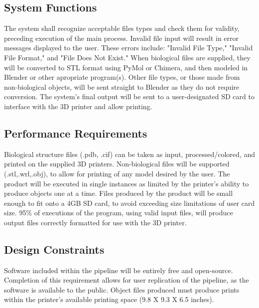 \documentclass[letterpaper, onecolumn, draftclsnofoot, 10pt, compsoc]{IEEEtran}
\begin{document}
    \subsection{System Functions}
    The system shall recognize acceptable files types and check them for validity, preceding execution of the main process.
    Invalid file input will result in error messages displayed to the user.
    These errors include: "Invalid File Type," "Invalid File Format," and "File Does Not Exist."
    When biological files are supplied, they will be converted to STL format using PyMol or Chimera, and then modeled in Blender or other apropriate program(s). 
    Other file types, or those made from non-biological objects, will be sent straight to Blender as they do not require conversion.
    The system's final output will be sent to a user-designated SD card to interface with the 3D printer and allow printing.
    
    \subsection{Performance Requirements}
    Biological structure files (.pdb, .cif) can be taken as input, processed/colored, and printed on the supplied 3D printers.
	Non-biological files will be supported (.stl,.wrl,.obj), to allow for printing of any model desired by the user.
    The product will be executed in single instances as limited by the printer's ability to produce objects one at a time.
    Files produced by the product will be small enough to fit onto a 4GB SD card, to avoid exceeding size limitations of user card size.
    95\% of executions of the program, using valid input files, will produce output files correctly formatted for use with the 3D printer.
    
    \subsection{Design Constraints}
    Software included within the pipeline will be entirely free and open-source. 
    Completion of this requirement allows for user replication of the pipeline, as the software is available to the public.
    Object files produced must produce prints within the printer's available printing space (9.8 X 9.3 X 6.5 inches).
    
\end{document}
